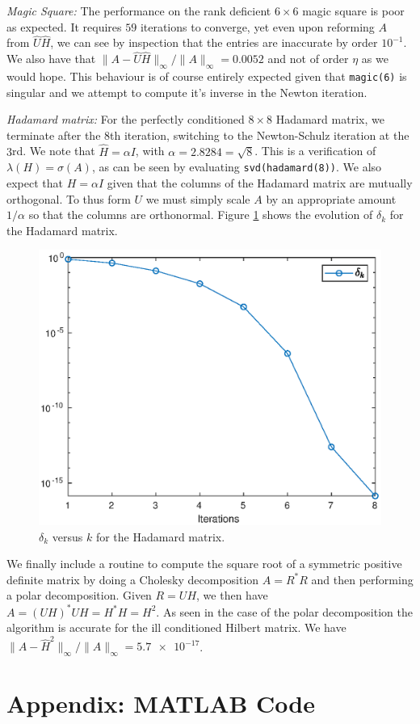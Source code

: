 \documentclass[12pt]{article}
\def\normo#1{\|#1\|_{\infty}}
\begin{document}
\textit{Magic Square:}
The performance on the rank deficient $6\times 6$ magic
square is poor as expected. It requires $59$ iterations to converge, yet even
upon reforming $A$ from $\hat{U}\hat{H}$, we can see by inspection that the
entries are inaccurate by order $10^{-1}$. We also have that
$\normo{A - \hat{U}\hat{H}}/\normo{A} = 0.0052$ and not of order $\eta$ as we
would hope. This behaviour is of course entirely expected given that
\texttt{magic(6)} is singular and we attempt to compute it's inverse in the
Newton iteration.

\textit{Hadamard matrix:} For the perfectly conditioned $8\times 8$ Hadamard
matrix, we terminate after the $8$th iteration, switching to the Newton-Schulz
iteration at the $3$rd. We note that $\hat{H} = \alpha I$, with
$\alpha = 2.8284 = \sqrt{8}$.  This is a verification of
$\lambda(H) = \sigma(A)$, as can be seen by evaluating
\texttt{svd(hadamard(8))}. We also expect that $H = \alpha I$ given that the
columns of the Hadamard matrix are mutually orthogonal. To thus form $U$ we must
simply scale $A$ by an appropriate amount $1/\alpha$ so that the columns are
orthonormal. Figure \ref{fig:hadamard} shows the evolution of $\delta_k$ for the
Hadamard matrix.
\begin{figure}
  \centering
  \includegraphics[scale=0.8]{hadamard}
  \caption{$\delta_k$ versus $k$ for the Hadamard matrix.}
  \label{fig:hadamard}    
\end{figure}

We finally include a routine to compute the square root of a symmetric positive
definite matrix by doing a Cholesky decomposition $A = R^*R$ and then performing
a polar decomposition.
Given $R = UH$, we then have $A = (UH)^*UH = H^*H = H^2$.
As seen in the case of the polar decomposition the algorithm is accurate for the
ill conditioned Hilbert matrix.
We have $\normo{A - \hat{H}^2}/\normo{A} = \num{5.7e-17}$.

\section*{Appendix: MATLAB Code}





\end{document}
